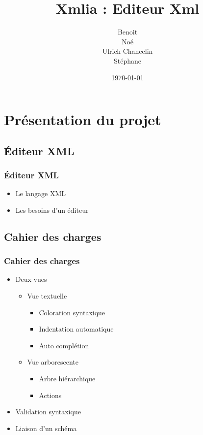 \documentclass{beamer}
\title{Xmlia : Editeur Xml}
\author []{
\bsc{BOIVIN} Benoit\\
\bsc{LE PHILIPPE} Noé\\
\bsc{KEGBA-SANGO-SANGO} Ulrich-Chancelin\\
\bsc{WOUTERS} Stéphane
}
\institute{}
\date{\today}
\begin{document}
	\begin{frame}
		\titlepage
	\end{frame}

	\section{Présentation du projet}

  \subsection{Éditeur XML}

  \begin{frame}
    \frametitle{Éditeur XML}
     \begin{itemize}
      \item Le langage XML
      \pause
      \item Les besoins d'un éditeur
      \end{itemize}
  \end{frame}

	\subsection{Cahier des charges}

	\begin{frame}
		\frametitle{Cahier des charges}

    \begin{itemize}
    \item Deux vues
     \begin{itemize}
      \item Vue textuelle
       \pause
         \begin{itemize}
          \item Coloration syntaxique
          \pause
          \item Indentation automatique
          \pause
          \item Auto complétion
          \pause
          \end{itemize}
      \item Vue arborescente
      \pause
          \begin{itemize}
          \item Arbre hiérarchique
           \pause
          \item Actions
           \pause
          \end{itemize}
      \end{itemize}
    \item Validation syntaxique
    \pause
    \item Liaison d'un schéma
    \end{itemize}

	\end{frame}
\end{document}
